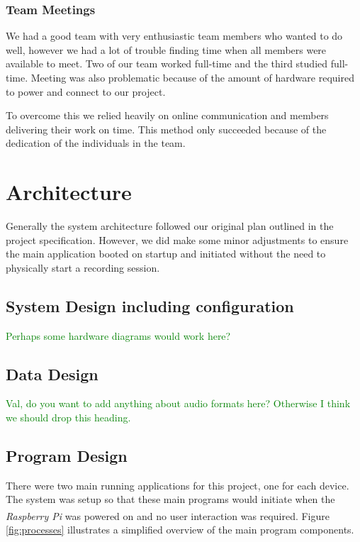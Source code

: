 \documentclass[11pt,a4paper,titlepage]{report}
\newcommand{\rpi}{\textit{Raspberry Pi\textsuperscript{\textregistered}}}
\begin{document}
\subsubsection{Team Meetings}

We had a good team with very enthusiastic team members who wanted to do well, however we had a lot of trouble finding time when all members were available to meet. Two of our team worked full-time and the third studied full-time. Meeting was also problematic because of the amount of hardware required to power and connect to our project.

To overcome this we relied heavily on online communication and members delivering their work on time. This method only succeeded because of the dedication of the individuals in the team.


\section{Architecture}

Generally the system architecture followed our original plan outlined in the project specification. However, we did make some minor adjustments to ensure the main application booted on startup and initiated without the need to physically start a recording session.

\subsection{System Design including configuration}

\textcolor{green}{Perhaps some hardware diagrams would work here?}

\subsection{Data Design}

\textcolor{green}{Val, do you want to add anything about audio formats here? Otherwise I think we should drop this heading.}



\subsection{Program Design}

There were two main running applications for this project, one for each device. The system was setup so that these main programs would initiate when the \rpi\xspace was powered on and no user interaction was required. Figure \ref{fig:processes} illustrates a simplified overview of the main program components.
\end{document}
